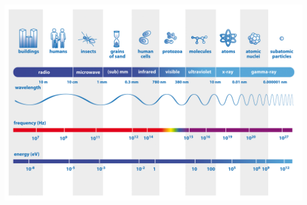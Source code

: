 \documentclass[12pt]{exam}
\begin{document}
\begin{center}
\noindent\includegraphics[width=\textwidth]{../images/emSpectrum.jpg}
\end{center}

\clearpage
\end{document}

